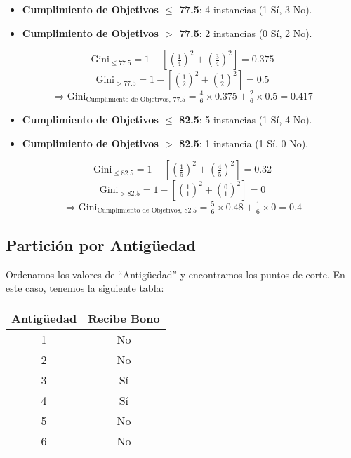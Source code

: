 \documentclass[12pt]{article}
\begin{document}
\begin{itemize}
  \item \textbf{Cumplimiento de Objetivos $\leq$ 77.5}: 4 instancias (1 Sí, 3 No).
  \item \textbf{Cumplimiento de Objetivos $>$ 77.5}: 2 instancias (0 Sí, 2 No).
\end{itemize}
\[
  \mathrm{Gini}_{\le77.5} = 1 - \left[\left(\tfrac{1}{4}\right)^2 + \left(\tfrac{3}{4}\right)^2\right] = 0.375
\]
\[
  \mathrm{Gini}_{>77.5} = 1 - \left[\left(\tfrac{1}{2}\right)^2 + \left(\tfrac{1}{2}\right)^2\right] = 0.5
\]
\[
  \Rightarrow \mathrm{Gini}_{\text{Cumplimiento de Objetivos, 77.5}} = \tfrac{4}{6}\times0.375 + \tfrac{2}{6}\times0.5 = 0.417
\]

\begin{itemize}
  \item \textbf{Cumplimiento de Objetivos $\leq$ 82.5}: 5 instancias (1 Sí, 4 No).
    \item \textbf{Cumplimiento de Objetivos $>$ 82.5}: 1 instancia (1 Sí, 0 No).
  \end{itemize}

  \[
    \mathrm{Gini}_{\le82.5} = 1 - \left[\left(\tfrac{1}{5}\right)^2 + \left(\tfrac{4}{5}\right)^2\right] = 0.32
  \]
  \[
    \mathrm{Gini}_{>82.5} = 1 - \left[\left(\tfrac{1}{1}\right)^2 + \left(\tfrac{0}{1}\right)^2\right] = 0
\]
\[
  \Rightarrow \mathrm{Gini}_{\text{Cumplimiento de Objetivos, 82.5}} = \tfrac{5}{6}\times0.48 + \tfrac{1}{6}\times0 = 0.4
\]

\subsection{Partición por Antigüedad}

Ordenamos los valores de ``Antigüedad'' y encontramos los puntos de corte. En este caso, tenemos la siguiente tabla:

\begin{table}[h]
  \centering
  \begin{tabular}{cc}
    \toprule
    Antigüedad & Recibe Bono \\
    \midrule
    1 & No \\
    2 & No \\
    3 & Sí \\
    4 & Sí \\
    5 & No \\
    6 & No \\
    \bottomrule
  \end{tabular}
\end{table}
\end{document}
